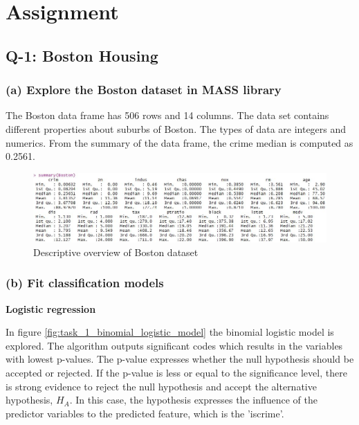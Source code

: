 \section{Assignment}

\subsection{Q-1: Boston Housing}

\subsubsection*{(a) Explore the Boston dataset in MASS library}
\label{ref:logistic_regression}
The Boston data frame has 506 rows and 14 columns. The data set contains different properties about suburbs of Boston. The types of data are integers and numerics. From the summary of the data frame, the crime median is computed as 0.2561. 

\begin{figure}[H]
\centering
\includegraphics[scale=0.49]{Graphics/Assignment1/ExploreBoston.JPG}
\caption{Descriptive overview of Boston dataset}
\label{fig:logistic_regression_confusions_matrix_001}
\end{figure}


\subsubsection*{(b) Fit classification models}
\textbf{Logistic regression}

In figure \ref{fig:task_1_binomial_logistic_model} the binomial logistic model is explored. The algorithm outputs significant codes which results in the variables with lowest p-values. The p-value expresses whether the null hypothesis should be accepted or rejected. If the p-value is less or equal to the significance level, there is strong evidence to reject the null hypothesis and accept the alternative hypothesis, $H_A$.   
In this case, the hypothesis expresses the influence of the predictor variables to the predicted feature, which is the 'iscrime'. 

